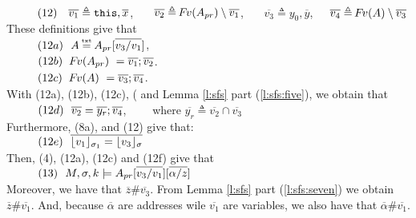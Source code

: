 \begin{description}
\\
$\SPS (12) \ \ \ \overline {v_1} \triangleq \prg{this},\overline x$, \ \ \ 
$\overline {v_2} \triangleq  \fv(\Apr)\setminus \overline {v_1}$, \ \ \ 
$\overline {v_3} \triangleq  y_0,\overline y$,\ \ \ 
$\overline {v_4} \triangleq  \fv(A)\setminus \overline {v_3}$
\\
These definitions give that
\\
$\SPS (12a) \ \  A \txteq \Apr[\overline {v_3/v_1}]$,
\\
$\SPS (12b)  \ \  \fv(\Apr)\ =\overline{v_1}; \overline {v_2}$.
\\ 
$\SPS (12c)  \ \  \fv(A)\ =\overline {v_3};\overline {v_4} $.
\\
With (12a), (12b), (12c), (  and Lemma \ref{l:sfs}  part (\ref{l:sfs:five}), we obtain that \\ 
$\SPS (12d)\ \    \overline {v_2} =   \overline{y_r}; \overline{v_4}$, \ \ \ \ where $\overline{y_r}\triangleq {\overline {v_2}}\cap  \overline {v_3}$
\\
Furthermore, (8a), and (12) give that:\\
$\SPS (12e) \ \  \overline { {\interpret {\sigma_1} {v_1}} = {\interpret {\sigma} {v_3}} }$
\\
Then, (4),  (12a),   (12c) and (12f)  give that\\
$\SPS (13) \ \ \satDAssertFrom M  {\sigma} {k}   {\Apr[\overline{v_3/v_1}][\overline{\alpha/z}]}$\\
Moreover, we have that $\overline z \# \overline {v_3}$. From   Lemma \ref{l:sfs}  part (\ref{l:sfs:seven}) we obtain $\overline z \# \overline {v_1}$. 
And, because $\overline \alpha$ are addresses wile $\overline {v_1}$ are variables, we also have that $\overline \alpha\#\overline {v_1}$.

\end{description}
